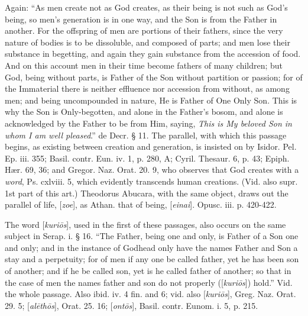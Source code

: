 Again: ``As men create not as God creates, as
their being is not such as God's being, so men's generation is
in one way, and the Son is from the Father in another. For the
offspring of men are portions of their fathers, since the very nature
of bodies is to be dissoluble, and composed of parts; and men lose
their substance in begetting, and again they gain substance from the
accession of food. And on this account men in their time become
fathers of many children; but God, being without parts, is Father of
the Son without partition or passion; for of the Immaterial there is
neither effluence nor accession from without, as among men; and being
uncompounded in nature, He is Father of One Only Son. This is why the
Son is Only-begotten, and alone in the Father's bosom, and alone is
acknowledged by the Father to be from Him, saying, \emph{This
is My beloved Son in whom I am well pleased}.'' de Decr. § 11. The
parallel, with which this passage begins, as existing between creation
and generation, is insisted on by Isidor. Pel. Ep. iii. 355; Basil.
contr. Eun. iv. 1, p. 280, A; Cyril. Thesaur. 6, p. 43; Epiph. Hær.
69, 36; and Gregor. Naz. Orat. 20. 9, who observes that God creates
with a \emph{word}, Ps. cxlviii. 5,
which evidently transcends human creations. (Vid. also supr. 1st part
of this art.) Theodorus Abucara, with the same object, draws out the
parallel of life, [\emph{zoe}], as Athan. that of being, [\emph{einai}].
Opusc. iii. p. 420-422.

The word
[\emph{kuri\={o}s}], used in the first of these passages, also occurs on the same
subject in Serap. i. § 16. ``The Father, being one and only, is Father
of a Son one and only; and in the instance of Godhead only have the
names Father and Son a stay and a perpetuity; for of men if any
one be called father, yet he has been son of another; and if he be
called son, yet is he called father of another; so that in the case of
men the names father and son do not properly ([\emph{kuri\={o}s}])
hold.'' Vid. the whole passage. Also ibid. iv. 4 fin. and 6; vid. also
[\emph{kuri\={o}s}], Greg. Naz. Orat. 29. 5; [\emph{al\={e}th\={o}s}],
Orat. 25. 16; [\emph{ont\={o}s}], Basil. contr. Eunom. i. 5, p.
215.

